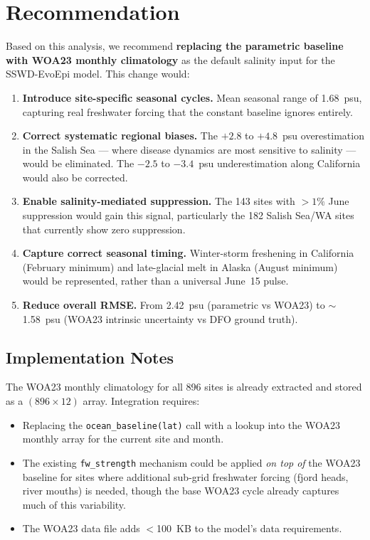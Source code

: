 \documentclass[11pt,a4paper]{article}
\begin{document}
\section{Recommendation}

Based on this analysis, we recommend \textbf{replacing the parametric baseline
with WOA23 monthly climatology} as the default salinity input for the
SSWD-EvoEpi model. This change would:

\begin{enumerate}
    \item \textbf{Introduce site-specific seasonal cycles.} Mean seasonal range
    of 1.68~psu, capturing real freshwater forcing that the constant baseline
    ignores entirely.

    \item \textbf{Correct systematic regional biases.} The $+2.8$ to $+4.8$~psu
    overestimation in the Salish Sea --- where disease dynamics are most sensitive
    to salinity --- would be eliminated. The $-2.5$ to $-3.4$~psu
    underestimation along California would also be corrected.

    \item \textbf{Enable salinity-mediated suppression.} The 143 sites with
    $>1\%$ June suppression would gain this signal, particularly the 182
    Salish Sea/WA sites that currently show zero suppression.

    \item \textbf{Capture correct seasonal timing.} Winter-storm freshening in
    California (February minimum) and late-glacial melt in Alaska (August
    minimum) would be represented, rather than a universal June~15 pulse.

    \item \textbf{Reduce overall RMSE.} From 2.42~psu (parametric vs WOA23)
    to $\sim$1.58~psu (WOA23 intrinsic uncertainty vs DFO ground truth).
\end{enumerate}

\subsection{Implementation Notes}

The WOA23 monthly climatology for all 896 sites is already extracted and stored
as a $(896 \times 12)$ array. Integration requires:

\begin{itemize}
    \item Replacing the \texttt{ocean\_baseline(lat)} call with a lookup into
    the WOA23 monthly array for the current site and month.
    \item The existing \texttt{fw\_strength} mechanism could be applied \emph{on
    top of} the WOA23 baseline for sites where additional sub-grid freshwater
    forcing (fjord heads, river mouths) is needed, though the base WOA23 cycle
    already captures much of this variability.
    \item The WOA23 data file adds $<$100~KB to the model's data requirements.
\end{itemize}
\end{document}
